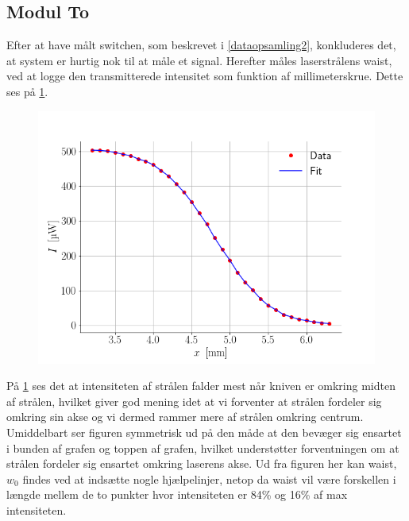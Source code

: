 \documentclass[main]{subfiles}
\begin{document}
\subsection{Modul To}
Efter at have målt switchen, som beskrevet i \cref{dataopsamling2}, konkluderes det, at system er hurtig nok til at måle et signal. Herefter måles laserstrålens waist, ved at logge den transmitterede intensitet som funktion af millimeterskrue. Dette ses på \cref{fig:graf3}.
\begin{figure}[H]
    \centering
    \includegraphics[width=\linewidth]{tegninger/graf3.png}
    \caption{}
    \label{fig:graf3}
\end{figure}
På \cref{fig:graf3} ses det at intensiteten af strålen falder mest når kniven er omkring midten af strålen, hvilket giver god mening idet at vi forventer at strålen fordeler sig omkring sin akse og vi dermed rammer mere af strålen omkring centrum. Umiddelbart ser figuren symmetrisk ud på den måde at den bevæger sig ensartet i bunden af grafen og toppen af grafen, hvilket understøtter forventningen om at strålen fordeler sig ensartet omkring laserens akse.
Ud fra figuren her kan waist, $w_0$ findes ved at indsætte nogle hjælpelinjer, netop da waist vil være forskellen i længde mellem de to punkter hvor intensiteten er 84\% og 16\% af max intensiteten.
\end{document}
